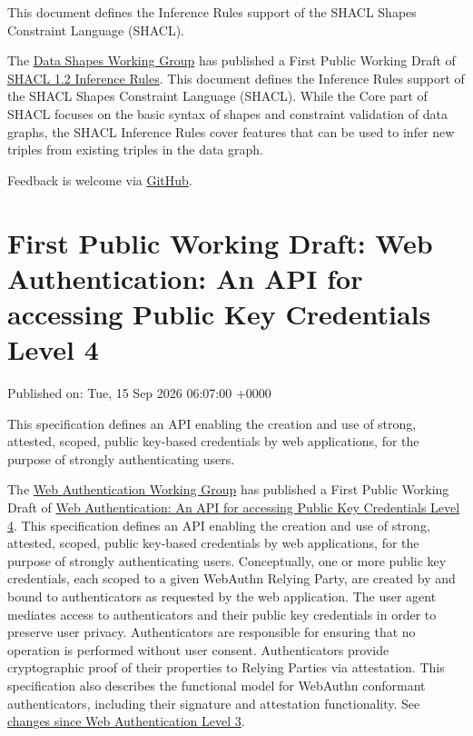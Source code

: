 \documentclass[11pt,a4paper]{article}
\begin{document}
This document defines the Inference Rules support of the SHACL Shapes Constraint Language (SHACL).

The \href{https://www.w3.org/groups/wg/data-shapes}{Data Shapes Working Group} has published a First Public Working Draft of \href{https://www.w3.org/TR/2026/WD-shacl12-inference-rules-20260917/}{SHACL 1.2 Inference Rules}. This document defines the Inference Rules support of the SHACL Shapes Constraint Language (SHACL). While the Core part of SHACL focuses on the basic syntax of shapes and constraint validation of data graphs, the SHACL Inference Rules cover features that can be used to infer new triples from existing triples in the data graph.

Feedback is welcome via \href{https://github.com/w3c/data-shapes/}{GitHub}.

\section{First Public Working Draft: Web Authentication: An API for accessing Public Key Credentials Level 4}

Published on: Tue, 15 Sep 2026 06:07:00 +0000

This specification defines an API enabling the creation and use of strong, attested, scoped, public key-based credentials by web applications, for the purpose of strongly authenticating users.

The \href{https://www.w3.org/groups/wg/webauthn/}{Web Authentication Working Group} has published a First Public Working Draft of \href{https://www.w3.org/TR/2026/WD-webauthn-4-20260915/}{Web Authentication: An API for accessing Public Key Credentials Level 4}. This specification defines an API enabling the creation and use of strong, attested, scoped, public key-based credentials by web applications, for the purpose of strongly authenticating users. Conceptually, one or more public key credentials, each scoped to a given WebAuthn Relying Party, are created by and bound to authenticators as requested by the web application. The user agent mediates access to authenticators and their public key credentials in order to preserve user privacy. Authenticators are responsible for ensuring that no operation is performed without user consent. Authenticators provide cryptographic proof of their properties to Relying Parties via attestation. This specification also describes the functional model for WebAuthn conformant authenticators, including their signature and attestation functionality. See \href{https://www.w3.org/TR/2026/WD-webauthn-4-20260915/\#changes-since-l3}{changes since Web Authentication Level 3}.
\end{document}
